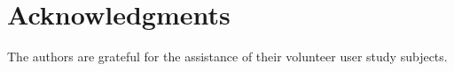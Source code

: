 \documentclass[letterpaper]{acm_proc_article-sp}
\begin{document}














\section{Acknowledgments}
The authors are grateful for the assistance of their volunteer user study
subjects.



\end{document}
